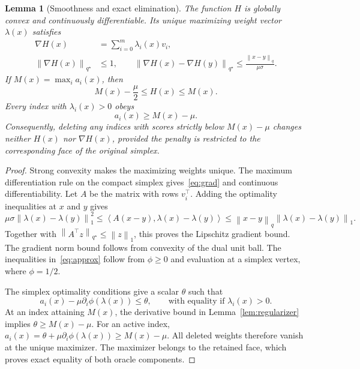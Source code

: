 \documentclass[11pt,a4paper]{article}
\newtheorem{lemma}[theorem]{Lemma}
\theoremstyle{definition}
\theoremstyle{remark}
\newcommand{\norm}[1]{\left\lVert #1\right\rVert}
\newcommand{\ip}[2]{\left\langle #1,#2\right\rangle}
\begin{document}
\begin{lemma}[Smoothness and exact elimination]\label{lem:smoothing}
The function $H$ is globally convex and continuously differentiable.
Its unique maximizing weight vector $\lambda(x)$ satisfies
\begin{align}
 \nabla H(x)&=\sum_{i=0}^m\lambda_i(x)v_i,\label{eq:grad}\\
 \norm{\nabla H(x)}_{q^\star}&\le1,\qquad
 \norm{\nabla H(x)-\nabla H(y)}_{q^\star}
       \le\frac{\norm{x-y}_q}{\mu\sigma}.\label{eq:lipgrad}
\end{align}
If $M(x)=\max_i a_i(x)$, then
\begin{equation}\label{eq:approx}
  M(x)-\frac\mu2\le H(x)\le M(x).
\end{equation}
Every index with $\lambda_i(x)>0$ obeys
\begin{equation}\label{eq:active}
  a_i(x)\ge M(x)-\mu.
\end{equation}
Consequently, deleting any indices with scores strictly below $M(x)-\mu$
changes neither $H(x)$ nor $\nabla H(x)$, provided the penalty is restricted
to the corresponding face of the original simplex.
\end{lemma}

\begin{proof}
Strong convexity makes the maximizing weights unique. The maximum
differentiation rule on the compact simplex gives~\eqref{eq:grad} and
continuous differentiability. Let $A$ be the matrix with rows $v_i^\top$.
Adding the optimality inequalities at $x$ and $y$ gives
\[
 \mu\sigma\norm{\lambda(x)-\lambda(y)}_1^2
 \le\ip{A(x-y)}{\lambda(x)-\lambda(y)}
 \le\norm{x-y}_q\norm{\lambda(x)-\lambda(y)}_1.
\]
Together with $\norm{A^\top z}_{q^\star}\le\norm{z}_1$, this proves the
Lipschitz gradient bound. The gradient norm bound follows from convexity of
the dual unit ball. The inequalities in~\eqref{eq:approx} follow from
$\phi\ge0$ and evaluation at a simplex vertex, where $\phi=1/2$.

The simplex optimality conditions give a scalar $\theta$ such that
\[
 a_i(x)-\mu\partial_i\phi(\lambda(x))\le\theta,
 \qquad\text{with equality if }\lambda_i(x)>0.
\]
At an index attaining $M(x)$, the derivative bound in
Lemma~\ref{lem:regularizer} implies $\theta\ge M(x)-\mu$.
For an active index,
$a_i(x)=\theta+\mu\partial_i\phi(\lambda(x))\ge M(x)-\mu$.
All deleted weights therefore vanish at the unique maximizer. The maximizer
belongs to the retained face, which proves exact equality of both oracle
components.
\end{proof}
\end{document}
